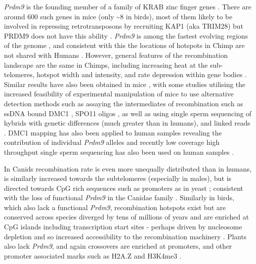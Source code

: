 \textit{Prdm9} is the founding member of a family of KRAB zinc finger genes \parencite{Birtle2006Meisetz}.
There are around 600 such genes in mice (only \textasciitilde8 in birds), most of them likely to be involved in repressing retrotransposons by recruiting KAP1 (aka TRIM28) but PRDM9 does not have this ability \parencite{Imbeault2017KRAB, Bruno2019Arms}.
\textit{Prdm9} is among the fastest evolving regions of the genome \parencite{Oliver2009Accelerated}, and consistent with this the locations of hotspots in Chimp are not shared with Humans \parencite{Wall2003Comparative, Ptak2004Absence, Ptak2005Finescale, Winckler2005Comparison}.
However, general features of the recombination landscape are the same in Chimps, including increasing heat at the sub-telomeres, hotspot width and intensity, and rate depression within gene bodies \parencite{Auton2012FineScale}.
Similar results have also been obtained in mice \parencite{Paigen2008Recombinational, Brunschwig2012FineScale, Booker2017Recombination}, with some studies utilising the increased feasibility of experimental manipulation of mice to use alternative detection methods such as assaying the intermediates of recombination such as ssDNA bound DMC1 \parencite{Smagulova2011Genomewide, Khil2012Sensitive, Smagulova2016evolutionary}, SPO11 oligos \parencite{Lange2016Landscape}, as well as using single sperm sequencing of hybrids with genetic differences (much greater than in humans)\parencite{Hinch2019Factors}, and linked reads \parencite{Dreau2019Genomewide}.
DMC1 mapping has also been applied to human samples revealing the contribution of individual \textit{Prdm9} alleles \parencite{Pratto2014Recombination} and recently low coverage high throughput single sperm sequencing has also been used on human samples \parencite{Bell2019Insights}.

In Canids recombination rate is even more unequally distributed than in humans, is similarly increased towards the subtelomeres (especially in males), but is directed towards CpG rich sequences such as promoters as in yeast \parencite{Auton2013Genetic, Campbell2016PedigreeBased}; consistent with the loss of functional \textit{Prdm9} in the Canidae family \parencite{Munoz-Fuentes2011Prdm9}.
Similarly in birds, which also lack a functional \textit{Prdm9}, recombination hotspots exist but are conserved across species diverged by tens of millions of years and are enriched at CpG islands including transcription start sites - perhaps driven by nucleosome depletion and so increased accessibility to the recombination machinery \parencite{Singhal2015Stable}.
Plants also lack \textit{Prdm9}, and again crossovers are enriched at promoters, and other promoter associated marks such as H2A.Z and H3K4me3 \parencite{Choi2013Arabidopsis, Marand2017Meiotic}.

